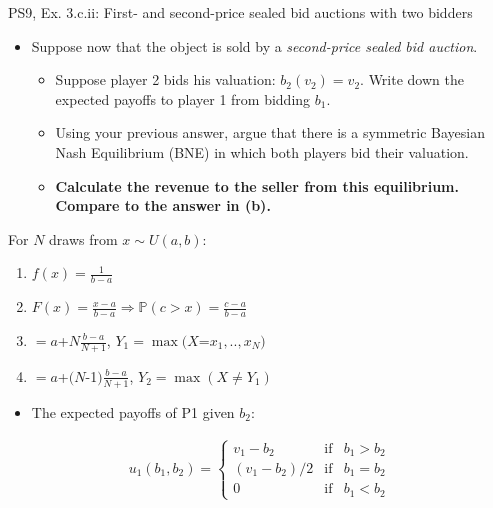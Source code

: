 \begin{frame}{PS9, Ex. 3.c.ii: First- and second-price sealed bid auctions with two bidders}
    \begin{multicols}{2}
      \begin{itemize}
        \item[(c)] Suppose now that the object is sold by a \textit{second-price sealed bid auction}.
        \begin{itemize}\normalsize
          \item[i.]   Suppose player 2 bids his valuation: $b_2(v_2) = v_2$. Write down the expected payoffs to player 1 from bidding $b_1$.
          \item[ii.]  Using your previous answer, argue that there is a symmetric Bayesian Nash Equilibrium (BNE) in which both players bid their valuation.
          \item[iii.] \textbf{Calculate the revenue to the seller from this equilibrium. Compare to the answer in (b).}
        \end{itemize}
      \end{itemize}
      For $N$ draws from $x\sim U(a, b):$
      \vspace{-6pt}
      \begin{enumerate}
        \item[PDF:] $f(x)=\frac{1}{b-a}$
        \item[CDF:] $F(x)=\frac{x-a}{b-a}\Rightarrow\mathbb{P}(c>x)=\frac{c-a}{b-a}$
        \item[$\mathbb{E}(Y_1)$] $=a$+$N\frac{b-a}{N+1}$, $Y_1=\max(X$=$x_1,..,x_N)$
        \item[$\mathbb{E}(Y_2)$] $=a$+$(N$-1$)\frac{b-a}{N+1}$, $Y_2=\max(X\neq Y_1)$
      \end{enumerate}
      \vfill\null\columnbreak
      \begin{itemize}
        \item[(i)] The expected payoffs of P1 given $b_2$:
      \end{itemize}
      \vspace{-12pt}
      \begin{align*}
        u_1(b_1,b_2)=\left\{\begin{array}{lcl}
          v_1-b_2     & \text{if} & b_1>b_2 \\
          (v_1-b_2)/2 & \text{if} & b_1=b_2 \\
          0           & \text{if} & b_1<b_2
        \end{array}\right.
      \end{align*}

\end{multicols}
\end{frame}
